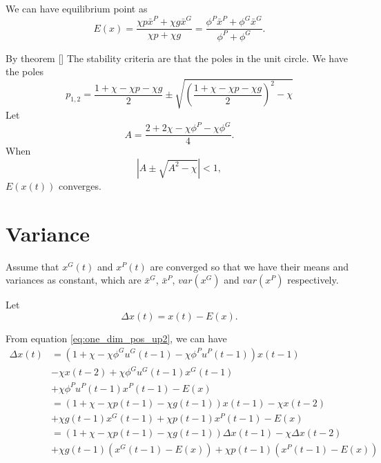 \documentclass[12pt]{article}
\begin{document}
We can have equilibrium point as 
\begin{equation}
E(x) = \frac{ \chi p \bar{x}^{P} + \chi g \bar{x}^{G} }{ \chi p + \chi g } = \frac{ \phi^{P} \bar{x}^{P} + \phi^{G} \bar{x}^{G} }{ \phi^{P} + \phi^{G} }
.
\end{equation}

By theorem []
The stability criteria are that the poles in the unit circle.
We have the poles 
\begin{equation}
\label{eq:mean_poles}
p_{1,2} = \frac{ 1 + \chi - \chi p - \chi g }{2} \pm \sqrt{ \left( \frac{ 1 + \chi - \chi p - \chi g }{2} \right)^{2} - \chi }
\end{equation}
Let 
\begin{equation}
\label{eq:A}
A = \frac{ 2 + 2 \chi - \chi \phi^{P} - \chi \phi^{G} }{4}.
\end{equation}
When
\begin{equation}
| A \pm \sqrt{ A^{2} - \chi } | < 1,
\end{equation}
$ E(x(t)) $ converges.


\section{Variance}
\label{sec:app:variance}

Assume that $ x^{G}(t) $ and $ x^{P}(t) $ are converged so that we have their means and variances as constant, which are 
$ \bar{x}^{G} $, $ \bar{x}^{P} $, $ var({x}^{G}) $ and $ var({x}^{P}) $ respectively.

Let
\begin{equation}
\label{eq:def_delta_x}
\Delta x(t) = x(t) - E(x).
\end{equation}

From equation \eqref{eq:one_dim_pos_up2}, we can have
\begin{equation}
\label{eq:one_dim_delta_pos_up}
\begin{aligned}
\Delta x(t) & = ( 1 + \chi - \chi \phi^{G} u^{G}(t-1) - \chi \phi^{P} u^{P}(t-1) ) x(t-1) \\
& - \chi x(t-2) + \chi \phi^{G} u^{G}(t-1) x^{G}(t-1) \\
& + \chi \phi^{P} u^{P}(t-1) x^{P}(t-1) - E(x) \\
& = (1 + \chi - \chi p(t-1) - \chi g(t-1) ) x(t-1) - \chi x(t-2) \\
& + \chi g(t-1) x^{G}(t-1) + \chi p(t-1) x^{P}(t-1) - E(x) \\
& = (1 + \chi - \chi p(t-1) - \chi g(t-1) ) \Delta x(t-1)  - \chi \Delta x(t-2) \\
& + \chi g(t-1) ( x^{G}(t-1) - E(x) ) + \chi p(t-1) ( x^{P}(t-1) - E(x) )
\end{aligned}
\end{equation}
\end{document}
